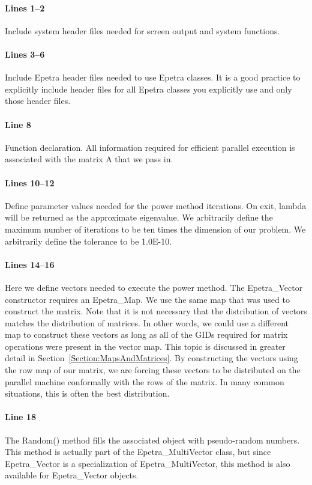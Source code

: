 \documentclass[12pt,relax]{EpetraUserGuide}
\newcommand{\map}{Epetra\_Map}
\renewcommand{\vector}{Epetra\_Vector}
\newcommand{\multivector}{Epetra\_MultiVector}
\begin{document}
\paragraph{Lines 1--2}
Include system header files needed for screen output and system
functions.
\paragraph{Lines 3--6}
Include Epetra header files needed to use Epetra classes.
It is a good practice to explicitly include header files for all
Epetra classes you explicitly use and only those header files.
\paragraph{Line 8} Function declaration.  All information required for
efficient parallel execution is associated with the matrix A that we
pass in.
\paragraph{Lines 10--12}
Define parameter values needed for the power method iterations.  On
exit, lambda will be returned as the approximate eigenvalue.  We
arbitrarily define the maximum number of iterations to be ten times
the dimension of our problem.  We arbitrarily define the tolerance to
be 1.0E-10.
\paragraph{Lines 14--16}
Here we define vectors needed to execute the power method.  The
\vector{} constructor requires an \map{}.  We use the same map that
was used to construct the matrix.  Note that it is not necessary that
the distribution of vectors matches the distribution of matrices.  In
other words, we could use a different map to construct these vectors
as long as all of the GIDs required for matrix operations were present
in the vector map.  This topic is discussed in greater detail in
Section~\ref{Section:MapsAndMatrices}.  By constructing the vectors using
the row map of our matrix, we are forcing these vectors to be
distributed on the parallel machine conformally with the rows of the
matrix.  In many common situations, this is often the best
distribution.
\paragraph{Line 18}
The Random() method fills the associated object with pseudo-random
numbers.  This method is actually part of the \multivector{} class,
but since \vector{} is a specialization of \multivector{}, this method
is also available for \vector{} objects.
\end{document}
